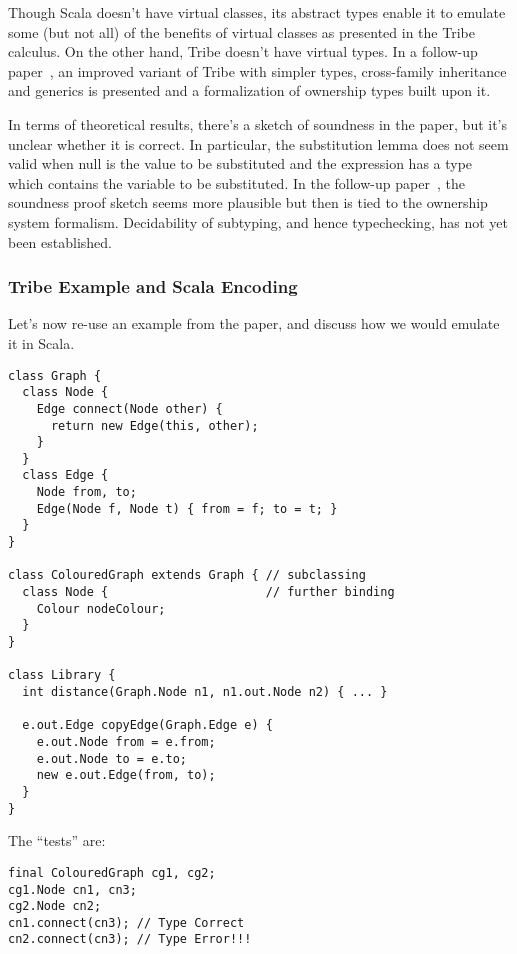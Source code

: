 \documentclass[10pt,journal,a4paper]{IEEEtran}
\begin{document}

Though Scala doesn't have virtual classes, its abstract types enable
it to emulate some (but not all) of the benefits of virtual classes as
presented in the Tribe calculus. On the other hand, Tribe doesn't have
virtual types. In a follow-up paper~\cite{tribalo}, an improved
variant of Tribe with simpler types, cross-family inheritance and
generics is presented and a formalization of ownership types built
upon it.

In terms of theoretical results, there's a sketch of soundness in the
paper, but it's unclear whether it is correct. In particular, the
substitution lemma does not seem valid when null is the value to be
substituted and the expression has a type which contains the variable
to be substituted. In the follow-up paper~\cite{tribalo}, the
soundness proof sketch seems more plausible but then is tied to the
ownership system formalism. Decidability of subtyping, and hence
typechecking, has not yet been established.

\subsubsection*{Tribe Example and Scala Encoding}
Let's now re-use an example from the paper, and discuss how we would
emulate it in Scala.
\begin{lstlisting}
class Graph {
  class Node {
    Edge connect(Node other) {
      return new Edge(this, other);
    }
  }
  class Edge {
    Node from, to;
    Edge(Node f, Node t) { from = f; to = t; }
  }
}

class ColouredGraph extends Graph { // subclassing
  class Node {                      // further binding
    Colour nodeColour;
  }
}

class Library {
  int distance(Graph.Node n1, n1.out.Node n2) { ... }

  e.out.Edge copyEdge(Graph.Edge e) {
    e.out.Node from = e.from;
    e.out.Node to = e.to;
    new e.out.Edge(from, to);
  }
}
\end{lstlisting}

The ``tests'' are:
\begin{lstlisting}
final ColouredGraph cg1, cg2;
cg1.Node cn1, cn3;
cg2.Node cn2;
cn1.connect(cn3); // Type Correct
cn2.connect(cn3); // Type Error!!!
\end{lstlisting}
\end{document}
